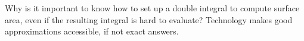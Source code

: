 {Why is it important to know how to set up a double integral to compute surface area, even if the resulting integral is hard to evaluate?
}
{Technology makes good approximations accessible, if not exact answers.
}